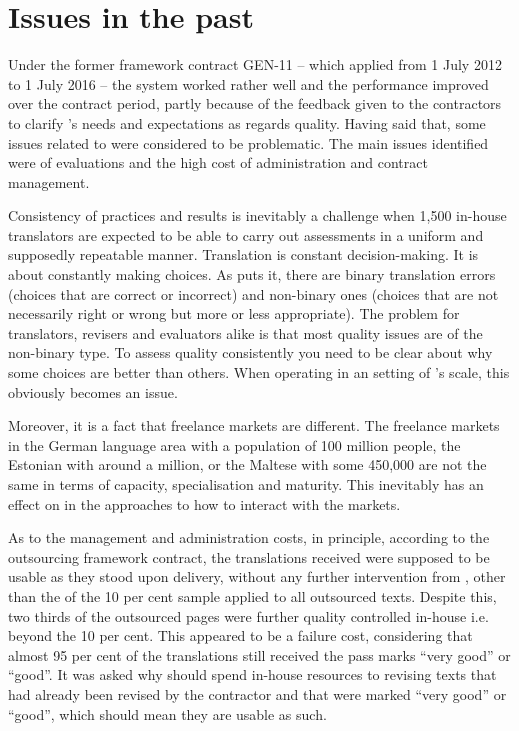 \documentclass[output=paper]{langsci/langscibook}
\begin{document}
\section{Issues in the past}\label{sec:strandvik:strandvic:3}

Under the former framework contract GEN-11 – which applied from 1 July 2012 to 1 July 2016 – the system worked rather well and the performance improved over the contract period, partly because of the feedback given to the contractors to clarify 's needs and expectations as regards quality. Having said that, some issues related to  were considered to be problematic. The main issues identified were  of evaluations and the high cost of administration and contract management. 

Consistency of  practices and results is inevitably a challenge when 1,500 in-house translators are expected to be able to carry out  assessments in a uniform and supposedly repeatable manner. Translation is constant decision-making. It is about constantly making choices. As \citet{Pym1992} puts it, there are binary translation errors (choices that are correct or incorrect) and non-binary ones (choices that are not necessarily right or wrong but more or less appropriate). The problem for translators, revisers and evaluators alike is that most quality issues are of the non-binary type. To assess quality consistently you need to be clear about why some choices are better than others. When operating in an  setting of 's scale, this obviously becomes an issue. 

Moreover, it is a fact that freelance markets are different. The freelance markets in the German language area with a population of 100 million people, the Estonian with around a million, or the Maltese with some 450,000 are not the same in terms of capacity, specialisation and maturity. This inevitably has an effect on  in the approaches to how to interact with the markets.

As to the management and administration costs, in principle, according to the outsourcing framework contract, the translations received were supposed to be usable as they stood upon delivery, without any further intervention from , other than the  of the 10 per cent sample applied to all outsourced texts. Despite this, two thirds of the outsourced pages were further quality controlled in-house i.e. beyond the 10 per cent. This appeared to be a failure cost, considering that almost 95 per cent of the translations still received the pass marks ``very good'' or ``good''. It was asked why  should spend in-house resources to revising texts that had already been revised by the contractor and that were marked ``very good'' or ``good'', which should mean they are usable as such.
\end{document}
